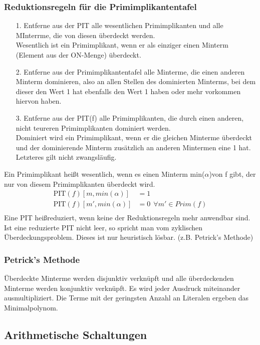 \documentclass{scrartcl}[10pt]
\begin{document}
\subsubsection{Reduktionsregeln f\"ur die Primimplikantentafel}
\begin{itemize}
\item[1.] Entferne aus der PIT alle wesentlichen Primimplikanten und alle MInterrme, die von diesen \"uberdeckt werden.\\ Wesentlich ist ein Primimplikant, wenn er als einziger einen Minterm (Element aus der ON-Menge) \"uberdeckt.
\item[2.]Entferne aus der Primimplikantentafel alle Minterme, die einen anderen Minterm dominieren, also an allen Stellen des dominierten Minterms, bei dem dieser den Wert 1 hat ebenfalls den Wert 1 haben oder mehr vorkommen hiervon haben.
\item[3.] Entferne aus der PIT(f) alle Primimplikanten, die durch einen anderen, nicht teureren Primimplikanten dominiert werden.\\ Dominiert wird ein Primimplikant, wenn er die gleichen Minterme \"uberdeckt und der dominierende Minterm zus\"atzlich an anderen Mintermen eine 1 hat. Letzteres gilt nicht zwangsl\"aufig.
\end{itemize}
Ein Primimplikant hei\ss t wesentlich, wenn es einen Minterm min($\alpha$)von f gibt, der nur von diesem Primimplikanten \"uberdeckt wird.
\begin{align*}
\text{PIT}(f)[m, min(\alpha)] &= 1\\
\text{PIT}(f)[m', min(\alpha)] &= 0 \ \ \forall m' \in Prim(f)\\
\end{align*}
Eine PIT hei\ss reduziert, wenn keine der Reduktionsregeln mehr anwendbar sind.\\
Ist eine reduzierte PIT nicht leer, so spricht man vom zyklischen \"Uberdeckungsproblem. Dieses ist nur heuristisch l\"osbar. (z.B. Petrick's Methode)
\subsubsection{Petrick's Methode}
\"Uberdeckte Minterme werden disjunktiv verkn\"upft und alle \"uberdeckenden Minterme werden konjunktiv verkn\"upft. Es wird jeder Ausdruck miteinander ausmultipliziert. Die Terme mit der geringsten Anzahl an Literalen ergeben das Minimalpolynom.
\subsection{Arithmetische Schaltungen}
\end{document}
